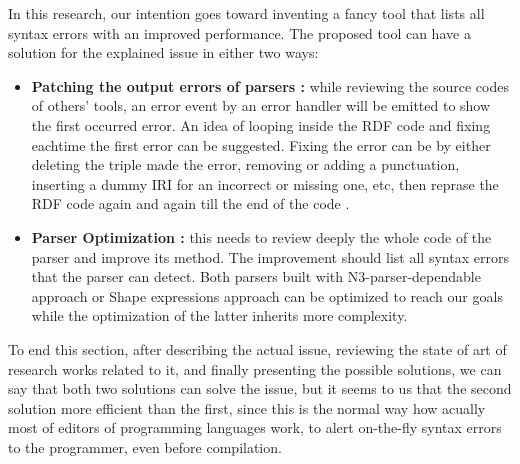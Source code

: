 \par
In this research, our intention goes toward inventing a fancy tool that lists all syntax errors with an improved performance. The proposed tool can have a solution for the explained issue in either two ways: 
\begin{itemize}[noitemsep] 
	\item \textbf{Patching the output errors of parsers :} while reviewing the source codes of others' tools, an error event by an error handler will be emitted to show the first occurred error. An idea of looping inside the RDF code and  fixing eachtime the first error can be suggested. Fixing the error can be by either deleting the triple made the error, removing or adding a punctuation, inserting a dummy IRI for an incorrect or missing one,  etc, then reprase the RDF code again and again till the end of the code .
	\item \textbf{Parser Optimization :} this needs to review deeply the whole code of the parser and improve its method. The improvement should list all syntax errors that the parser can detect. Both parsers built with N3-parser-dependable approach or Shape expressions approach can be optimized to reach our goals while the optimization of the latter inherits more complexity. 
\end{itemize} 

\par
To end this section, after describing the actual issue, reviewing the state of art of research works related to it, and finally presenting the possible solutions, we can say that both two solutions can solve the issue, but it seems to us that the second solution more efficient than the first, since this is the normal way how acually most of editors of programming languages work, to alert on-the-fly syntax errors to the programmer, even before compilation. 










